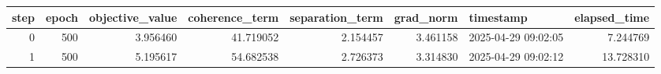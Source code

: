 \begin{tabular}{rrrrrrlr}
\toprule
step & epoch & objective\_value & coherence\_term & separation\_term & grad\_norm & timestamp & elapsed\_time \\
\midrule
0 & 500 & 3.956460 & 41.719052 & 2.154457 & 3.461158 & 2025-04-29 09:02:05 & 7.244769 \\
1 & 500 & 5.195617 & 54.682538 & 2.726373 & 3.314830 & 2025-04-29 09:02:12 & 13.728310 \\
\bottomrule
\end{tabular}
